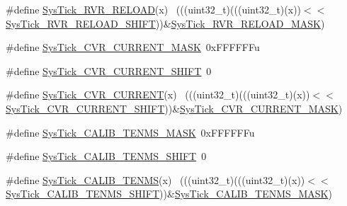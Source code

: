 \begin{DoxyCompactItemize}
\item 
\#define \hyperlink{group___sys_tick___register___masks_gabe33788bbfefe67549f0da8cabbc2495}{Sys\+Tick\+\_\+\+R\+V\+R\+\_\+\+R\+E\+L\+O\+AD}(x)                                    ~(((uint32\+\_\+t)(((uint32\+\_\+t)(x))$<$$<$\hyperlink{group___sys_tick___register___masks_gaada5987ab8604965af6e1437c97ee963}{Sys\+Tick\+\_\+\+R\+V\+R\+\_\+\+R\+E\+L\+O\+A\+D\+\_\+\+S\+H\+I\+FT}))\&\hyperlink{group___sys_tick___register___masks_gaec96452b3f6bd6a6ca6496cbbad9a9aa}{Sys\+Tick\+\_\+\+R\+V\+R\+\_\+\+R\+E\+L\+O\+A\+D\+\_\+\+M\+A\+SK})
\item 
\#define \hyperlink{group___sys_tick___register___masks_ga24c6d345c97c669b426339ffda71aa8b}{Sys\+Tick\+\_\+\+C\+V\+R\+\_\+\+C\+U\+R\+R\+E\+N\+T\+\_\+\+M\+A\+SK}~0x\+F\+F\+F\+F\+F\+Fu
\item 
\#define \hyperlink{group___sys_tick___register___masks_ga1e9eb575c58a4638dabd21775fa22c19}{Sys\+Tick\+\_\+\+C\+V\+R\+\_\+\+C\+U\+R\+R\+E\+N\+T\+\_\+\+S\+H\+I\+FT}~0
\item 
\#define \hyperlink{group___sys_tick___register___masks_ga97b2a7bb2c882eb623545fdad8b93316}{Sys\+Tick\+\_\+\+C\+V\+R\+\_\+\+C\+U\+R\+R\+E\+NT}(x)                                  ~(((uint32\+\_\+t)(((uint32\+\_\+t)(x))$<$$<$\hyperlink{group___sys_tick___register___masks_ga1e9eb575c58a4638dabd21775fa22c19}{Sys\+Tick\+\_\+\+C\+V\+R\+\_\+\+C\+U\+R\+R\+E\+N\+T\+\_\+\+S\+H\+I\+FT}))\&\hyperlink{group___sys_tick___register___masks_ga24c6d345c97c669b426339ffda71aa8b}{Sys\+Tick\+\_\+\+C\+V\+R\+\_\+\+C\+U\+R\+R\+E\+N\+T\+\_\+\+M\+A\+SK})
\item 
\#define \hyperlink{group___sys_tick___register___masks_gac7496217678b52cce71dd785ed2b779b}{Sys\+Tick\+\_\+\+C\+A\+L\+I\+B\+\_\+\+T\+E\+N\+M\+S\+\_\+\+M\+A\+SK}~0x\+F\+F\+F\+F\+F\+Fu
\item 
\#define \hyperlink{group___sys_tick___register___masks_gad2786b21e30185770874c88e29f22047}{Sys\+Tick\+\_\+\+C\+A\+L\+I\+B\+\_\+\+T\+E\+N\+M\+S\+\_\+\+S\+H\+I\+FT}~0
\item 
\#define \hyperlink{group___sys_tick___register___masks_ga67fd5343d7d5e3040a03a9d2a0cb4f33}{Sys\+Tick\+\_\+\+C\+A\+L\+I\+B\+\_\+\+T\+E\+N\+MS}(x)                                  ~(((uint32\+\_\+t)(((uint32\+\_\+t)(x))$<$$<$\hyperlink{group___sys_tick___register___masks_gad2786b21e30185770874c88e29f22047}{Sys\+Tick\+\_\+\+C\+A\+L\+I\+B\+\_\+\+T\+E\+N\+M\+S\+\_\+\+S\+H\+I\+FT}))\&\hyperlink{group___sys_tick___register___masks_gac7496217678b52cce71dd785ed2b779b}{Sys\+Tick\+\_\+\+C\+A\+L\+I\+B\+\_\+\+T\+E\+N\+M\+S\+\_\+\+M\+A\+SK})
$$
\end{DoxyCompactItemize}
